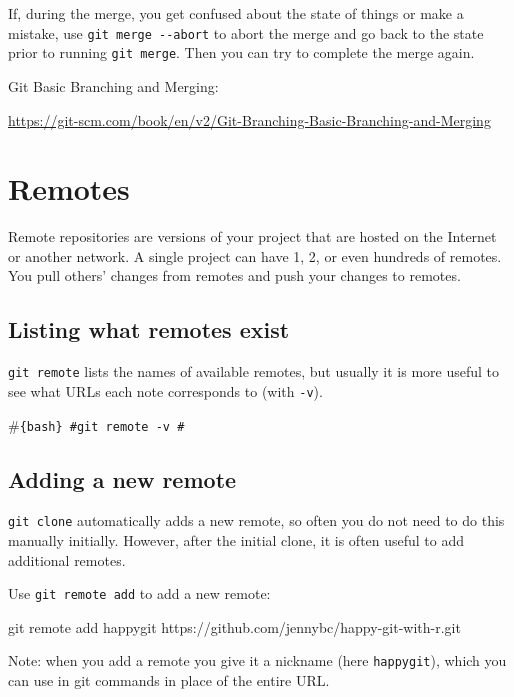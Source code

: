\documentclass[
]{book}
\newenvironment{Shaded}{\begin{snugshade}}{\end{snugshade}}
\newcommand{\NormalTok}[1]{#1}
\begin{document}
If, during the merge, you get confused about the state of things or make a
mistake, use \texttt{git\ merge\ -\/-abort} to abort the merge and go back to the state
prior to running \texttt{git\ merge}.
Then you can try to complete the merge again.

Git Basic Branching and Merging:

\url{https://git-scm.com/book/en/v2/Git-Branching-Basic-Branching-and-Merging}

\chapter{Remotes}\label{git-remotes}

Remote repositories are versions of your project that are hosted on the
Internet or another network.
A single project can have 1, 2, or even hundreds of remotes.
You pull others' changes from remotes and push your changes to remotes.

\section{Listing what remotes exist}\label{listing-what-remotes-exist}

\texttt{git\ remote} lists the names of available remotes, but usually it is more
useful to see what URLs each note corresponds to (with \texttt{-v}).

\#\texttt{\{bash\}\ \#git\ remote\ -v\ \#}

\section{Adding a new remote}\label{adding-a-new-remote}

\texttt{git\ clone} automatically adds a new remote, so often you do not need to do
this manually initially.
However, after the initial clone, it is often useful to add additional remotes.

Use \texttt{git\ remote\ add} to add a new remote:

\begin{Shaded}
\begin{Highlighting}[]
\NormalTok{git remote add happygit https://github.com/jennybc/happy{-}git{-}with{-}r.git}
\end{Highlighting}
\end{Shaded}

Note: when you add a remote you give it a nickname (here \texttt{happygit}), which you can use in git commands in place of the entire URL.
\end{document}
